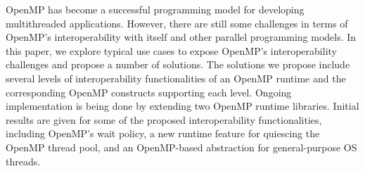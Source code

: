 OpenMP has become a successful programming model
for developing multithreaded applications.
However, there are still some challenges in terms of OpenMP's interoperability
with itself and other parallel programming models.
In this paper, we explore typical use cases to expose OpenMP's interoperability challenges and
propose a number of solutions.
The solutions we propose include several levels of interoperability functionalities of an OpenMP runtime and
the corresponding OpenMP constructs supporting each level.
Ongoing implementation is being done by extending two OpenMP runtime libraries.
Initial results are given for some of the proposed interoperability functionalities, including OpenMP's wait policy,
a new runtime feature for quiescing the OpenMP thread pool,
and an OpenMP-based abstraction for general-purpose OS threads.
